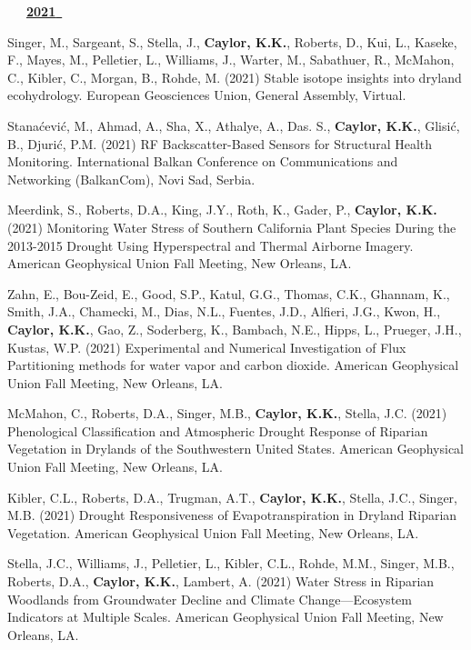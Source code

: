 \begin{etaremune}
\vspace{0.1in}
\mbox{\ \ \ \underline{\textbf{2021 }}}
\vspace{0.1in}

\item Singer, M., Sargeant, S., Stella, J., \textbf{ Caylor, K.K.}, Roberts, D., Kui, L., Kaseke, F., Mayes, M., Pelletier, L., Williams, J., Warter, M., Sabathuer, R., McMahon, C., Kibler, C., Morgan, B., Rohde, M. (2021) Stable isotope insights into dryland ecohydrology. European Geosciences Union, General Assembly, Virtual.
\item Stanaćević, M., Ahmad, A., Sha, X., Athalye, A., Das. S., \textbf{ Caylor, K.K.}, Glisić, B., Djurić, P.M. (2021) RF Backscatter-Based Sensors for Structural Health Monitoring. International Balkan Conference on Communications and Networking (BalkanCom), Novi Sad, Serbia.
\item Meerdink, S., Roberts, D.A., King, J.Y., Roth, K., Gader, P., \textbf{ Caylor, K.K.} (2021) Monitoring Water Stress of Southern California Plant Species During the 2013-2015 Drought Using Hyperspectral and Thermal Airborne Imagery. American Geophysical Union Fall Meeting, New Orleans, LA.
\item Zahn, E., Bou-Zeid, E., Good, S.P., Katul, G.G., Thomas, C.K., Ghannam, K., Smith, J.A., Chamecki, M., Dias, N.L., Fuentes, J.D., Alfieri, J.G., Kwon, H., \textbf{ Caylor, K.K.}, Gao, Z., Soderberg, K., Bambach, N.E., Hipps, L., Prueger, J.H., Kustas, W.P. (2021) Experimental and Numerical Investigation of Flux Partitioning methods for water vapor and carbon dioxide. American Geophysical Union Fall Meeting, New Orleans, LA.
\item McMahon, C., Roberts, D.A., Singer, M.B., \textbf{ Caylor, K.K.}, Stella, J.C. (2021) Phenological Classification and Atmospheric Drought Response of Riparian Vegetation in Drylands of the Southwestern United States. American Geophysical Union Fall Meeting, New Orleans, LA.
\item Kibler, C.L., Roberts, D.A., Trugman, A.T., \textbf{ Caylor, K.K.}, Stella, J.C., Singer, M.B. (2021) Drought Responsiveness of Evapotranspiration in Dryland Riparian Vegetation. American Geophysical Union Fall Meeting, New Orleans, LA.
\item Stella, J.C., Williams, J., Pelletier, L., Kibler, C.L., Rohde, M.M., Singer, M.B., Roberts, D.A., \textbf{ Caylor, K.K.}, Lambert, A. (2021) Water Stress in Riparian Woodlands from Groundwater Decline and Climate Change—Ecosystem Indicators at Multiple Scales. American Geophysical Union Fall Meeting, New Orleans, LA.

\end{etaremune}
